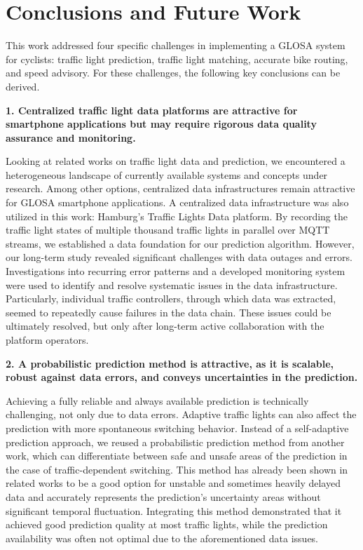 \chapter{Conclusions and Future Work}\label{ch:conclusions}

This work addressed four specific challenges in implementing a GLOSA system for cyclists: traffic light prediction, traffic light matching, accurate bike routing, and speed advisory. For these challenges, the following key conclusions can be derived.

\textbf{\color{cidarkblue}1. Centralized traffic light data platforms are attractive for smartphone applications but may require rigorous data quality assurance and monitoring.} 

Looking at related works on traffic light data and prediction, we encountered a heterogeneous landscape of currently available systems and concepts under research. Among other options, centralized data infrastructures remain attractive for GLOSA smartphone applications. A centralized data infrastructure was also utilized in this work: Hamburg's Traffic Lights Data platform. By recording the traffic light states of multiple thousand traffic lights in parallel over MQTT streams, we established a data foundation for our prediction algorithm. However, our long-term study revealed significant challenges with data outages and errors. Investigations into recurring error patterns and a developed monitoring system were used to identify and resolve systematic issues in the data infrastructure. Particularly, individual traffic controllers, through which data was extracted, seemed to repeatedly cause failures in the data chain. These issues could be ultimately resolved, but only after long-term active collaboration with the platform operators.

\textbf{\color{cidarkblue}2. A probabilistic prediction method is attractive, as it is scalable, robust against data errors, and conveys uncertainties in the prediction.} 

Achieving a fully reliable and always available prediction is technically challenging, not only due to data errors. Adaptive traffic lights can also affect the prediction with more spontaneous switching behavior. Instead of a self-adaptive prediction approach, we reused a probabilistic prediction method from another work, which can differentiate between safe and unsafe areas of the prediction in the case of traffic-dependent switching. This method has already been shown in related works to be a good option for unstable and sometimes heavily delayed data and accurately represents the prediction's uncertainty areas without significant temporal fluctuation. Integrating this method demonstrated that it achieved good prediction quality at most traffic lights, while the prediction availability was often not optimal due to the aforementioned data issues.

